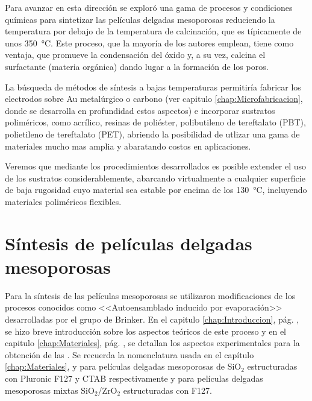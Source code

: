 	




	Para avanzar en esta dirección se exploró una gama de procesos y condiciones químicas para sintetizar las películas delgadas mesoporosas reduciendo la temperatura por debajo de la temperatura de calcinación, que es típicamente de unos \SI{350}{\celsius}. Este proceso, que la mayoría de los autores emplean, tiene como ventaja, que promueve la condensación del óxido y, a su vez, calcina el surfactante (materia orgánica) dando lugar a la formación de los poros.\cite{Zhang2015,Horiuchi2011,Clark2000,Zhang2005}

	La búsqueda de métodos de síntesis a bajas temperaturas permitiría fabricar los electrodos sobre Au metalúrgico o carbono (ver capitulo \ref{chap:Microfabricacion}, donde se desarrolla en profundidad estos aspectos) e incorporar sustratos poliméricos, como acrílico, resinas de poliéster, polibutileno de tereftalato (PBT), polietileno de tereftalato (PET), abriendo la posibilidad de utlizar una gama de materiales mucho mas amplia y abaratando costos en aplicaciones.

	Veremos que mediante los procedimientos desarrollados es posible extender el uso de los sustratos considerablemente, abarcando virtualmente a cualquier superficie de baja rugosidad cuyo material sea estable por encima de los \SI{130}{\celsius}, incluyendo materiales poliméricos flexibles.
		
\section{Síntesis de películas delgadas mesoporosas}
		
		Para la síntesis de las películas mesoporosas se utilizaron modificaciones de los procesos conocidos como <<Autoensamblado inducido por evaporación>> desarrolladas por el grupo de Brinker.\cite{Brinker1999} En el capitulo \ref{chap:Introduccion}, pág. \pageref{sec:mesoporosos}, se hizo breve introducción sobre los aspectos teóricos de este proceso y en el capitulo \ref{chap:Materiales}, pág. \pageref{sec:sintesis_mesoporosos}, se detallan los aspectos experimentales para la obtención de las \pdm. Se recuerda la nomenclatura usada en el capítulo \ref{chap:Materiales}, \pdmF\space y \pdmC\space para películas delgadas mesoporosas de SiO$_2$ estructuradas con Pluronic F127 y CTAB respectivamente y \pdmZ\space para películas delgadas mesoporosas mixtas SiO$_2$/ZrO$_2$ estructuradas con F127.

